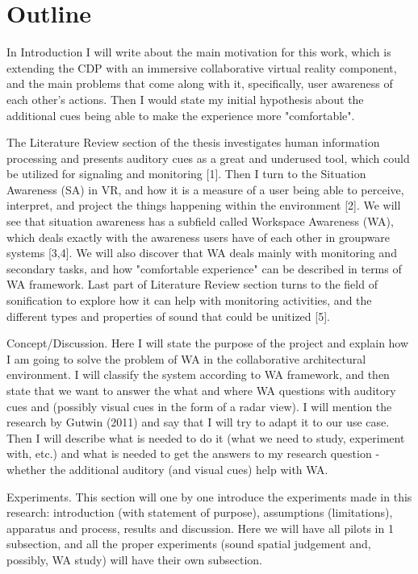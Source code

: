 \section{Outline}
In Introduction I will write about the main motivation for this work, which is extending the CDP with an immersive collaborative virtual reality component, and the main problems that come along with it, specifically, user awareness of each other's actions. Then I would state my initial hypothesis about the additional cues being able to make the experience more "comfortable".

The Literature Review section of the thesis investigates human information processing and presents auditory cues as a great and underused tool, which could be utilized for signaling and monitoring [1]. Then I turn to the Situation Awareness (SA) in VR, and how it is a measure of a user being able to perceive, interpret, and project the things happening within the environment [2]. We will see that situation awareness has a subfield called Workspace Awareness (WA), which deals exactly with the awareness users have of each other in groupware systems [3,4]. We will also discover that WA deals mainly with monitoring and secondary tasks, and how "comfortable experience" can be described in terms of WA framework. Last part of Literature Review section turns to the field of sonification to explore how it can help with monitoring activities, and the different types and properties of sound that could be unitized [5].

Concept/Discussion. Here I will state the purpose of the project and explain how I am going to solve the problem of WA in the collaborative architectural environment. I will classify the system according to WA framework, and then state that we want to answer the what and where WA questions with auditory cues and (possibly visual cues in the form of a radar view). I will mention the research by Gutwin (2011) and say that I will try to adapt it to our use case. Then I will describe what is needed to do it (what we need to study, experiment with, etc.) and what is needed to get the answers to my research question - whether the additional auditory (and visual cues) help with WA.

Experiments. This section will one by one introduce the experiments made in this research: introduction (with statement of purpose), assumptions (limitations), apparatus and process, results and discussion. Here we will have all pilots in 1 subsection, and all the proper experiments (sound spatial judgement and, possibly, WA study) will have their own subsection.


